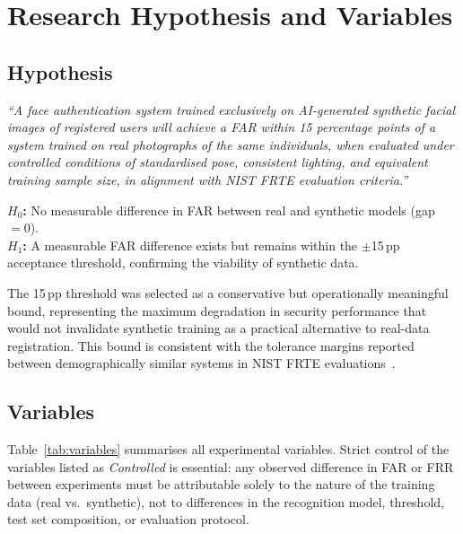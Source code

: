 \documentclass[conference]{IEEEtran}
\begin{document}
\section{Research Hypothesis and Variables}

\subsection{Hypothesis}

\textit{``A face authentication system trained exclusively on AI-generated synthetic facial images of registered users will achieve a FAR within 15 percentage points of a system trained on real photographs of the same individuals, when evaluated under controlled conditions of standardised pose, consistent lighting, and equivalent training sample size, in alignment with NIST FRTE evaluation criteria.''}

\noindent\textbf{$H_0$:} No measurable difference in FAR between real and synthetic models (gap $= 0$).\\
\textbf{$H_1$:} A measurable FAR difference exists but remains within the $\pm$15\,pp acceptance threshold, confirming the viability of synthetic data.

The 15\,pp threshold was selected as a conservative but operationally meaningful bound, representing the maximum degradation in security performance that would not invalidate synthetic training as a practical alternative to real-data registration. This bound is consistent with the tolerance margins reported between demographically similar systems in NIST FRTE evaluations~\cite{nist_frte}.

\subsection{Variables}

Table~\ref{tab:variables} summarises all experimental variables. Strict control of the variables listed as \textit{Controlled} is essential: any observed difference in FAR or FRR between experiments must be attributable solely to the nature of the training data (real vs.\ synthetic), not to differences in the recognition model, threshold, test set composition, or evaluation protocol.
\end{document}
